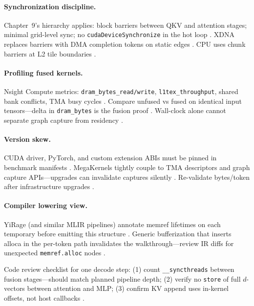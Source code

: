 \paragraph{Synchronization discipline.} Chapter~9's hierarchy applies: block barriers between QKV and attention stages; minimal grid-level sync; no \texttt{cudaDeviceSynchronize} in the hot loop \citep{memoryfloor2026}. XDNA replaces barriers with DMA completion tokens on static edges \citep{amd2024aie}. CPU uses chunk barriers at L2 tile boundaries \citep{dlbook}.

\paragraph{Profiling fused kernels.} Nsight Compute metrics: \texttt{dram\_bytes\_read/write}, \texttt{l1tex\_throughput}, shared bank conflicts, TMA busy cycles \citep{semianalysis2024tma,memoryfloor2026}. Compare unfused vs fused on identical input tensors---delta in \texttt{dram\_bytes} is the fusion proof \citep{taxbreak2026,yirage2026}. Wall-clock alone cannot separate graph capture from residency \citep{nvidia2024cudagraphs,memoryfloor2026,patel2025llminference}.

\paragraph{Version skew.} CUDA driver, PyTorch, and custom extension ABIs must be pinned in benchmark manifests \citep{kwon2023vllm,taxbreak2026}. MegaKernels tightly couple to TMA descriptors and graph capture APIs---upgrades can invalidate captures silently \citep{nvidia2024cudagraphs,semianalysis2024tma}. Re-validate bytes/token after infrastructure upgrades \citep{memoryfloor2026,yirage2026}.

\paragraph{Compiler lowering view.} YiRage (and similar MLIR pipelines) annotate memref lifetimes on each temporary before emitting this structure \citep{yirage2026,chen2020compilerbasedhardw}. Generic bufferization that inserts alloca in the per-token path invalidates the walkthrough---review IR diffs for unexpected \texttt{memref.alloc} nodes \citep{memoryfloor2026,kwon2023vllm}.

\begin{example}
Code review checklist for one decode step: (1) count \texttt{\_\_syncthreads} between fusion stages---should match planned pipeline depth; (2) verify no \texttt{store} of full $d$-vectors between attention and MLP; (3) confirm KV append uses in-kernel offsets, not host callbacks \citep{taxbreak2026,yirage2026}.
\end{example}

